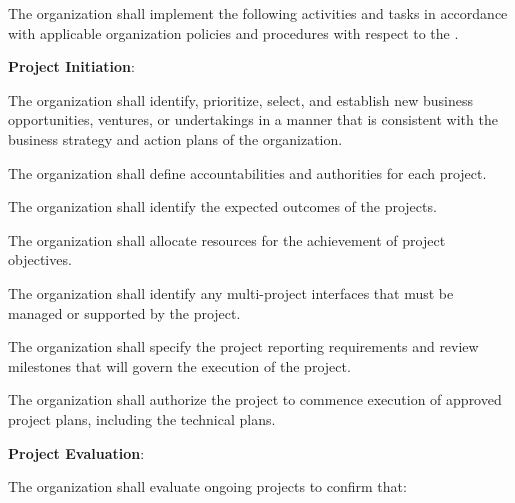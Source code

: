 			\begin{adjustwidth}{2em}{0pt} 
				
				The organization shall implement the following activities and tasks in accordance with applicable organization policies and procedures with respect to the .

				\begin{compactenum}

					\item {\bf Project Initiation}:

					\begin{compactenum}

						\item The organization shall identify, prioritize, select, and establish new business opportunities, ventures, or undertakings in a manner that is consistent with the business strategy and action plans of the organization.

						\item The organization shall define accountabilities and authorities for each project.

						\item The organization shall identify the expected outcomes of the projects.

						\item The organization shall allocate resources for the achievement of project objectives.

						\item The organization shall identify any multi-project interfaces that must be managed or supported by the project.

						\item The organization shall specify the project reporting requirements and review milestones that will govern the execution of the project.
						
						\item The organization shall authorize the project to commence execution of approved project plans, including the technical plans.

					\end{compactenum}

					\item {\bf Project Evaluation}:

					\begin{compactenum}

						\item The organization shall evaluate ongoing projects to confirm that:


\end{compactenum}
\end{compactenum}
\end{adjustwidth}
